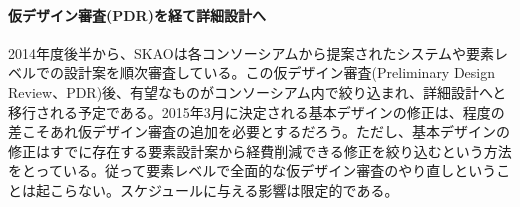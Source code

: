 \paragraph{仮デザイン審査(PDR)を経て詳細設計へ} 

2014年度後半から、SKAOは各コンソーシアムから提案されたシステムや要素レベルでの設計案を順次審査している。この仮デザイン審査(Preliminary Design Review、PDR)後、有望なものがコンソーシアム内で絞り込まれ、詳細設計へと移行される予定である。2015年3月に決定される基本デザインの修正は、程度の差こそあれ仮デザイン審査の追加を必要とするだろう。ただし、基本デザインの修正はすでに存在する要素設計案から経費削減できる修正を絞り込むという方法をとっている。従って要素レベルで全面的な仮デザイン審査のやり直しということは起こらない。スケジュールに与える影響は限定的である。

